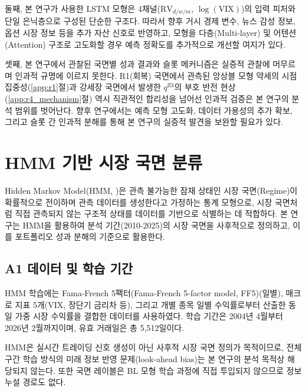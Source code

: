 \documentclass[eng]{kjas3}
\begin{document}
둘째, 본 연구가 사용한 LSTM 모형은 4채널($\mathrm{RV}_{d/w/m}$, $\log(\mathrm{VIX})$)의 입력 피처와 단일 은닉층으로 구성된 단순한 구조다. 따라서 향후 거시 경제 변수, 뉴스 감성 정보, 옵션 시장 정보 등을 추가 자산 신호로 반영하고, 모형을 다층(Multi-layer) 및 어텐션(Attention) 구조로 고도화할 경우 예측 정확도를 추가적으로 개선할 여지가 있다.

셋째, 본 연구에서 관찰된 국면별 성과 결과와 슬롯 메커니즘은 실증적 관찰에 머무르며 인과적 규명에 이르지 못한다. R1(회복) 국면에서 관측된 앙상블 모형 약세의 시점 집중성(\ref{app:r1}절)과 강세장 국면에서 발생한 $q^{\mathrm{ff3}}$의 부호 반전 현상(\ref{app:r4_mechanism}절) 역시 직관적인 합리성을 넘어선 인과적 검증은 본 연구의 분석 범위를 벗어난다. 향후 연구에서는 예측 모형 고도화, 데이터 가용성의 추가 확보, 그리고 슬롯 간 인과적 분해를 통해 본 연구의 실증적 발견을 보완할 필요가 있다.


\appendix

\section{HMM 기반 시장 국면 분류}\label{app:hmm}

Hidden Markov Model(HMM, \citealp{hamilton1989new})은 관측 불가능한 잠재 상태인 시장 국면(Regime)이 확률적으로 전이하며 관측 데이터를 생성한다고 가정하는 통계 모형으로, 시장 국면처럼 직접 관측되지 않는 구조적 상태를 데이터를 기반으로 식별하는 데 적합하다. 본 연구는 HMM을 활용하여 분석 기간(2010-2025)의 시장 국면을 사후적으로 정의하고, 이를 포트폴리오 성과 분해의 기준으로 활용한다.

\subsection*{A1 데이터 및 학습 기간}

HMM 학습에는 Fama-French 5팩터(Fama-French 5-factor model, FF5)(일별), 매크로 지표 5개(VIX, 장단기 금리차 등), 그리고 개별 종목 일별 수익률로부터 산출한 동일 가중 시장 수익률을 결합한 데이터를 사용하였다. 학습 기간은 2004년 4월부터 2026년 2월까지이며, 유효 거래일은 총 5,512일이다.

HMM은 실시간 트레이딩 신호 생성이 아닌 사후적 시장 국면 정의가 목적이므로, 전체 구간 학습 방식의 미래 정보 반영 문제(look-ahead bias)는 본 연구의 분석 목적상 해당되지 않는다. 또한 국면 레이블은 BL 모형 학습 과정에 직접 투입되지 않으므로 정보 누설 경로도 없다.
\end{document}
